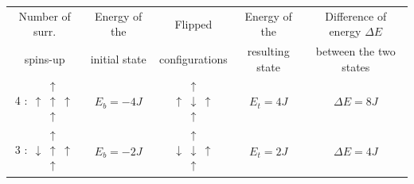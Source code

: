 \documentclass[a4paper, twoside, 11pt]{report}
\theoremstyle{theorem}
\theoremstyle{remark}
\theoremstyle{exemple}
\begin{document}
                \begin{center}
                    \begin{tabular}{|c|c|c|c|c|}
                        \hline
                        Number of surr. & Energy of the  & Flipped & Energy of the & Difference of energy $\Delta E$ \\
                        spins-up & initial state & configurations & resulting state & between the two states\\
                        \hline \hline
                        4 : $\begin{array}{ccc}
                                  & \uparrow & \\
                                 \uparrow & \uparrow & \uparrow \\
                                  & \uparrow & 
                              \end{array}$ & $E_b=-4J$ & $\begin{array}{ccc}
                                                             & \uparrow & \\
                                                             \uparrow & \downarrow & \uparrow \\
                                                             & \uparrow & 
                                                          \end{array}$ & $E_t=4J$ & $\Delta E = 8J$ \\
                        \hline
                        3 : $\begin{array}{ccc}
                                  & \uparrow & \\
                                 \downarrow & \uparrow & \uparrow \\
                                  & \uparrow & 
                              \end{array}$ & $E_b=-2J$ & $\begin{array}{ccc}
                                                             & \uparrow & \\
                                                             \downarrow & \downarrow & \uparrow \\
                                                             & \uparrow & 
                                                          \end{array}$ & $E_t=2J$ & $\Delta E = 4J$ \\
                        \hline

\end{tabular}
\end{center}
\end{document}
